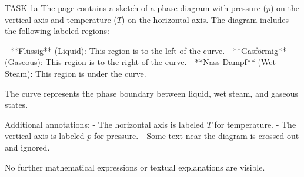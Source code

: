 TASK 1a  
The page contains a sketch of a phase diagram with pressure (\( p \)) on the vertical axis and temperature (\( T \)) on the horizontal axis. The diagram includes the following labeled regions:  

- **Flüssig** (Liquid): This region is to the left of the curve.  
- **Gasförmig** (Gaseous): This region is to the right of the curve.  
- **Nass-Dampf** (Wet Steam): This region is under the curve.  

The curve represents the phase boundary between liquid, wet steam, and gaseous states.  

Additional annotations:  
- The horizontal axis is labeled \( T \) for temperature.  
- The vertical axis is labeled \( p \) for pressure.  
- Some text near the diagram is crossed out and ignored.  

No further mathematical expressions or textual explanations are visible.